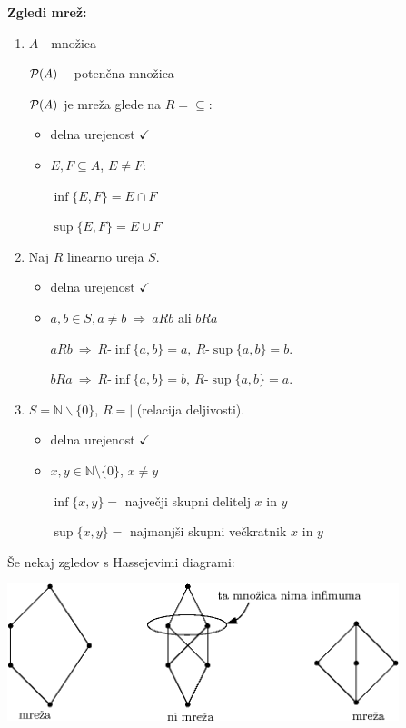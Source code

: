 \documentclass[11pt,paper=b5,footinclude,headinclude]{scrbook} %
\def\sledi {{~\Rightarrow~}}
\begin{document}
\textbf{ Zgledi mrež:}
\begin{enumerate}
  \item $A$ - množica

  ${\cal P}(A)$ -- potenčna množica

  ${\cal P}(A)$ je mreža glede na $R = \subseteq$:
  \begin{itemize}
    \item delna urejenost $\checkmark$
     \item $E,F\subseteq A$, $E\neq F$:

     $\inf\{E,F\} = E\cap F$

     $\sup\{E,F\} = E\cup F$
  \end{itemize}
  \item Naj $R$ linearno ureja $S$.
\begin{itemize}
    \item delna urejenost $\checkmark$

    \item
   $a, b\in S, a\neq b\sledi aRb$ ali $bRa$

$aRb\sledi R\textrm{-}\inf\{a,b\} = a,~R\textrm{-}\sup\{a,b\} = b$.

$bRa\sledi R\textrm{-}\inf\{a,b\} = b,~R\textrm{-}\sup\{a,b\} = a$.
\end{itemize}

  \item $S = \mathbb{N}\backslash \{0\}$, $R = |$ (relacija deljivosti).
  \begin{itemize}
    \item delna urejenost $\checkmark$
    \item $x,y\in \mathbb{N}\setminus\{0\}$, $x\neq y$

    $\inf\{x,y\} = $ največji skupni delitelj $x$ in $y$

    $\sup\{x,y\} = $ najmanjši skupni večkratnik $x$ in $y$
  \end{itemize}
\end{enumerate}

\bigskip
\newpage
Še nekaj zgledov s Hassejevimi diagrami:
\begin{center}
\includegraphics[height=40mm]{Hasse4.eps}
\end{center}
\end{document}

